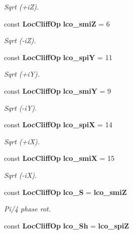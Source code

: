 \begin{CompactItemize}
\begin{CompactList}\small\item\em Sqrt (+i\-Z). \item\end{CompactList}\item 
const  {\bf Loc\-Cliff\-Op} {\bf lco\_\-smi\-Z} = 6\label{loccliff_8h_a7}

\begin{CompactList}\small\item\em Sqrt (-i\-Z). \item\end{CompactList}\item 
const  {\bf Loc\-Cliff\-Op} {\bf lco\_\-spi\-Y} = 11\label{loccliff_8h_a8}

\begin{CompactList}\small\item\em Sqrt (+i\-Y). \item\end{CompactList}\item 
const  {\bf Loc\-Cliff\-Op} {\bf lco\_\-smi\-Y} = 9\label{loccliff_8h_a9}

\begin{CompactList}\small\item\em Sqrt (-i\-Y). \item\end{CompactList}\item 
const  {\bf Loc\-Cliff\-Op} {\bf lco\_\-spi\-X} = 14\label{loccliff_8h_a10}

\begin{CompactList}\small\item\em Sqrt (+i\-X). \item\end{CompactList}\item 
const  {\bf Loc\-Cliff\-Op} {\bf lco\_\-smi\-X} = 15\label{loccliff_8h_a11}

\begin{CompactList}\small\item\em Sqrt (-i\-X). \item\end{CompactList}\item 
const  {\bf Loc\-Cliff\-Op} {\bf lco\_\-S} = {\bf lco\_\-smi\-Z}\label{loccliff_8h_a12}

\begin{CompactList}\small\item\em Pi/4 phase rot. \item\end{CompactList}\item 
const  {\bf Loc\-Cliff\-Op} {\bf lco\_\-Sh} = {\bf lco\_\-spi\-Z}\label{loccliff_8h_a13}


\end{CompactItemize}
